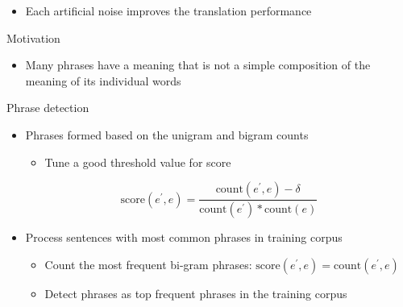 \documentclass[11pt, a4paper, landscape]{article}
\begin{document}
	\begin{itemize}
		\item Each artificial noise improves the translation performance
	\end{itemize}
		\vfill	
		
	
\NewPage
{}
Motivation
\begin{itemize}
	\item Many phrases have a meaning that is not a simple composition of the meaning of its individual words\\
\end{itemize}
Phrase detection
\begin{itemize}
	\item Phrases formed based on the unigram and bigram counts\\
	\cite{mikolov2013distributed} 
	\begin{itemize}
		\item Tune a good threshold value for score
	\end{itemize}
	\[ \textrm{score}(e^\prime, e) = \frac{\textrm{count}(e^\prime, e) - \delta}{\textrm{count}(e^\prime)*\textrm{count}(e)} \]	
	\item Process sentences with most common phrases in training corpus
	\begin{itemize}
		\item Count the most frequent bi-gram phrases: ${\textrm{score}(e^\prime, e) = \textrm{count}(e^\prime, e)}$
		\item Detect phrases as top frequent phrases in the training corpus
	\end{itemize}
	
\end{itemize}	
\NewPage
{}
\vfill
\end{document}
